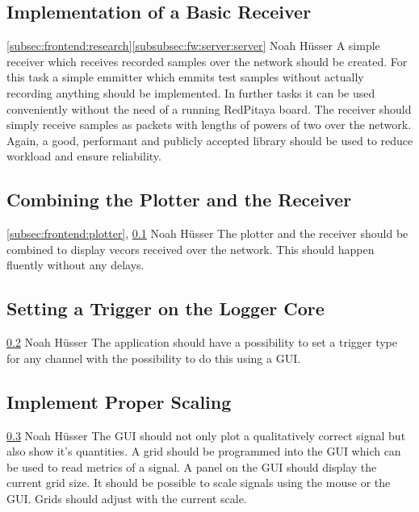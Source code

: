 \documentclass[a4paper,oneside]{alpenspecs/alpenspecs}
\begin{document}
\subsection{Implementation of a Basic Receiver}
\label{subsec:frontend:receiver}
\wpac
    {}
    {}
    {}
    {\ref{subsec:frontend:research}\ref{subsubsec:fw:server:server}}
    {}
    {Noah Hüsser}
    {%
        A simple receiver which receives recorded samples over the network should be created.
        For this task a simple emmitter which emmits test samples without actually recording anything should be implemented.
        In further tasks it can be used conveniently without the need of a running RedPitaya board.
        The receiver should simply receive samples as packets with lengths of powers of two over the network.
        Again, a good, performant and publicly accepted library should be used to reduce workload and ensure reliability.
    }

\subsection{Combining the Plotter and the Receiver}
\label{subsec:frontend:combining}
\wpac
    {}
    {}
    {}
    {\ref{subsec:frontend:plotter}, \ref{subsec:frontend:receiver}}
    {}
    {Noah Hüsser}
    {%
        The plotter and the receiver should be combined to display vecors received over the network.
        This should happen fluently without any delays.
    }

\subsection{Setting a Trigger on the Logger Core}
\label{subsec:frontend:trig}
\wpac
    {}
    {}
    {}
    {\ref{subsec:frontend:combining}}
    {}
    {Noah Hüsser}
    {%
        The application should have a possibility to set a trigger type for any channel with the possibility to do this using a GUI.
    }

\subsection{Implement Proper Scaling}
\label{subsec:frontend:scaling}
\wpac
    {}
    {}
    {}
    {\ref{subsec:frontend:trig}}
    {}
    {Noah Hüsser}
    {%
        The GUI should not only plot a qualitatively correct signal but also show it's quantities.
        A grid should be programmed into the GUI which can be used to read metrics of a signal. A panel on the GUI should display the current grid size.
        It should be possible to scale signals using the mouse or the GUI. Grids should adjust with the current scale.
    }
\end{document}
